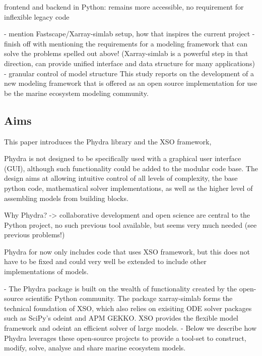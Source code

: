 \documentclass[journal abbreviation, manuscript]{copernicus}
\begin{document}
frontend and backend in Python: remains more accessible, no requirement for inflexible legacy code

- mention Fastscape/Xarray-simlab setup, how that inspires the current project
- finish off with mentioning the requirements for a modeling framework that can solve the problems spelled out above! (Xarray-simlab is a powerful step in that direction, can provide unified interface and data structure for many applications)
- granular control of model structure
This study reports on the development of a new modeling framework that is offered as an open source implementation for use be the marine ecosystem modeling community.


\subsection{Aims}
This paper introduces the Phydra library and the XSO framework,

Phydra is not designed to be specifically used with a graphical user interface (GUI), although such functionality could be added to the modular code base.
The design aims at allowing intuitive control of all levels of complexity, the base python code, mathematical solver implementations, as well as the higher level of assembling models from building blocks.

Why Phydra? -> collaborative development and open science are central to the Python project, no such previous tool available, but seems very much needed (see previous problems!)


Phydra for now only includes code that uses XSO framework, but this does not have to be fixed and could very well be extended to include other implementations of models.

- The Phydra package is built on the wealth of functionality created by the open-source scientific Python community. The package xarray-simlab forms the technical foundation of XSO, which also relies on exisiting ODE solver packages such as SciPy's odeint and APM GEKKO. XSO provides the flexible model framework and odeint an efficient solver of large models. 
- Below we describe how Phydra leverages these open-source projects to provide a tool-set to construct, modify, solve, analyse and share marine ecosystem models. 
\end{document}

